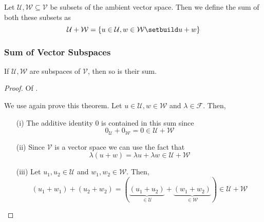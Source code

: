 \begin{definition}\label{def-sum-of-subsets}
	Let $\mathcal{U},\mathcal{W}\subseteq\mathcal{V}$ be subsets of the ambient
	vector space. Then we define the sum of both these subsets as
	\begin{equation}
		\mathcal{U}+\mathcal{W}=\left\{
		u\in\mathcal{U},w\in\mathcal{W}\setbuild u+w
		\right\}
	\end{equation}
\end{definition}

\subsubsection{Sum of Vector Subspaces}\label{subsubsec-sum-subspace}

\begin{thm}\label{thm-sum-subspace}
	If $\mathcal{U},\mathcal{W}$ are subspaces of $\mathcal{V}$, then so is their
	sum.
\end{thm}

\begin{proof}
	Of .
	\begin{flushleft}
		We use 
		again prove this theorem. Let $u\in\mathcal{U},w\in\mathcal{W}$ and
		$\lambda\in\mathcal{F}$. Then,
		\begin{enumerate}
			\item[(i)] The additive identity $0$ is contained in this sum since
				\begin{equation*}
					0_\mathcal{U}+0_\mathcal{W}=0\in\mathcal{U}+\mathcal{W}
				\end{equation*}
			\item[(ii)] Since $\mathcal{V}$ is a vector space we can use the fact that
				\begin{equation*}
					\lambda(u+w)=\lambda u + \lambda w \in\mathcal{U}+\mathcal{W}
				\end{equation*}
			\item[(iii)] Let $u_1,u_2\in\mathcal{U}$ and $w_1,w_2\in\mathcal{W}$. Then,
				\begin{equation*}
					(u_1+w_1)+(u_2+w_2)=\left(\underbrace{(u_1+u_2)}_{\in\mathcal{U}}+
					\underbrace{(w_1+w_2)}_{\in\mathcal{W}}
					\right)\in\mathcal{U}+\mathcal{W}
				\end{equation*}
		\end{enumerate}
	\end{flushleft}
\end{proof}

